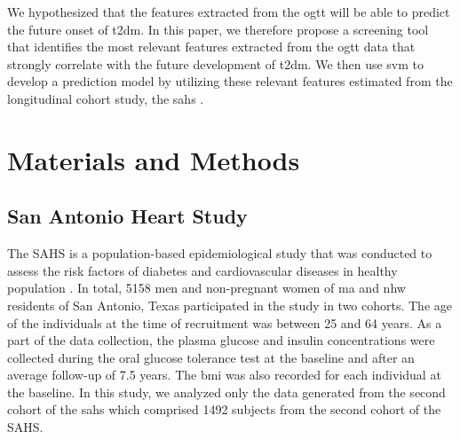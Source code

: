 \documentclass[journal,comsoc]{IEEEtran}
\renewcommand{\^}{\hat}  %
\begin{document}
We hypothesized that the features extracted from the \ac{ogtt} will be able to predict the future onset of \ac{t2dm}. In this paper, we therefore propose a screening tool that identifies the most relevant features extracted from the \ac{ogtt} data that strongly correlate with the future development of \ac{t2dm}. We then use \ac{svm} to develop a prediction model by utilizing these relevant features estimated from the longitudinal cohort study, the \ac{sahs} \cite{burke_rapid_1999,lorenzo_trend_2006}.
%
\section{Materials and Methods}
%
\subsection{San Antonio Heart Study}
%
The SAHS is a population-based epidemiological study that was conducted to assess the risk factors of diabetes and cardiovascular diseases in healthy population \cite{burke_rapid_1999,lorenzo_trend_2006}. In total, \num[group-minimum-digits=4, group-separator = {,}]{5158} men and non-pregnant women of \ac{ma} and \ac{nhw} residents of San Antonio, Texas participated in the study in two cohorts. The age of the individuals at the time of recruitment was between \num{25} and \num{64} years. As a part of the data collection, the plasma glucose and insulin concentrations were collected during the oral glucose tolerance test at the baseline and after an average follow-up of \num{7.5} years. The \ac{bmi} was also recorded for each individual at the baseline. In this study, we analyzed only the data generated from the second cohort of the \ac{sahs} which comprised \num[group-minimum-digits=4, group-separator = {,}]{1492} subjects from the second cohort of the SAHS.
\end{document}
